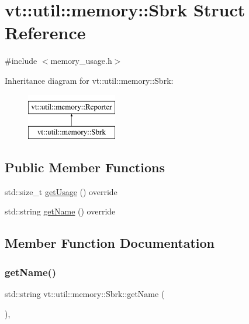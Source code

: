 \hypertarget{structvt_1_1util_1_1memory_1_1_sbrk}{}\section{vt\+:\+:util\+:\+:memory\+:\+:Sbrk Struct Reference}
\label{structvt_1_1util_1_1memory_1_1_sbrk}


{\ttfamily \#include $<$memory\+\_\+usage.\+h$>$}

Inheritance diagram for vt\+:\+:util\+:\+:memory\+:\+:Sbrk\+:\begin{figure}[H]
\begin{center}
\leavevmode
\includegraphics[height=2.000000cm]{structvt_1_1util_1_1memory_1_1_sbrk}
\end{center}
\end{figure}
\subsection*{Public Member Functions}
\begin{DoxyCompactItemize}
\item 
std\+::size\+\_\+t \hyperlink{structvt_1_1util_1_1memory_1_1_sbrk_af4df47e41f60e7f2da7a6b47c8b4a046}{get\+Usage} () override
\item 
std\+::string \hyperlink{structvt_1_1util_1_1memory_1_1_sbrk_a21fc8bafbdf0a4bb92184474dae1d0f1}{get\+Name} () override
\end{DoxyCompactItemize}


\subsection{Member Function Documentation}
\mbox{\label{structvt_1_1util_1_1memory_1_1_sbrk_a21fc8bafbdf0a4bb92184474dae1d0f1}} 
\subsubsection{\texorpdfstring{get\+Name()}{getName()}}
{\footnotesize\ttfamily std\+::string vt\+::util\+::memory\+::\+Sbrk\+::get\+Name (\begin{DoxyParamCaption}{ }\end{DoxyParamCaption})\hspace{0.3cm}{\ttfamily [override]}, {\ttfamily [virtual]}}



